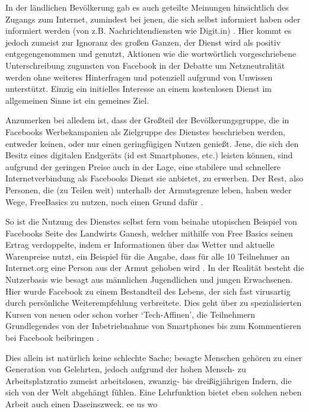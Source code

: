 \documentclass{article}
\begin{document}
In der ländlichen Bevölkerung gab es auch geteilte Meinungen hinsichtlich des Zugangs zum Internet, zumindest bei jenen, die sich selbst informiert haben oder informiert werden (von z.B. Nachrichtendiensten wie Digit.in) \parencite{digitYT}.
Hier kommt es jedoch zumeist zur Ignoranz des großen Ganzen, der Dienst wird als positiv entgegengenommen und genutzt, Aktionen wie die wortwörtlich vorgeschriebene Unterschreibung zugunsten von Facebook in der Debatte um Netzneutralität\autocite{ndtvYT} werden ohne weiteres Hinterfragen und potenziell aufgrund von Unwissen unterstützt.
Einzig ein initielles Interesse an einem kostenlosen Dienst im allgemeinen Sinne ist ein gemeines Ziel.

\medskip

Anzumerken bei alledem ist, dass der Großteil der Bevölkerungsgruppe, die in Facebooks Werbekampanien als Zielgruppe des Dienstes beschrieben werden, entweder keinen, oder nur einen geringfügigen Nutzen genießt.
Jene, die sich den Besitz eines digitalen Endgeräts (id est Smartphones, etc.) leisten können, sind aufgrund der geringen Preise auch in der Lage, eine stabilere und schnellere Internetverbindung als Facebooks Dienst sie anbietet, zu erwerben.
Der Rest, also Personen, die (zu Teilen weit) unterhalb der Armutsgrenze leben, haben weder Wege, FreeBasics zu nutzen, noch einen Grund dafür \parencite[257]{everydayLife}.

\medskip

So ist die Nutzung des Dienstes selbst fern vom beinahe utopischen Beispiel von Facebooks Seite des Landwirts Ganesh, welcher mithilfe von Free Basics seinen Ertrag verdoppelte, indem er Informationen über das Wetter und aktuelle Warenpreise nutzt, ein Beispiel für die Angabe, dass für alle 10 Teilnehmer an Internet.org eine Person aus der Armut gehoben wird \parencite[4]{prasad2017}.
In der Realität besteht die Nutzerbasis wie besagt aus männlichen Jugendlichen und jungen Erwachsenen.
Hier wurde Facebook zu einem Bestandteil des Lebens, der sich fast virusartig durch persönliche Weiterempfehlung verbreitete.
Dies geht über zu spezialisierten Kursen von neuen oder schon vorher `Tech-Affinen', die Teilnehmern Grundlegendes von der Inbetriebnahme von Smartphones bis zum Kommentieren bei Facebook beibringen \parencite{empowermentThroughFacebook}.

\medskip

Dies allein ist natürlich keine schlechte Sache; besagte Menschen gehören zu einer Generation von Gelehrten, jedoch aufgrund der hohen Mensch- zu Arbeitsplatzratio zumeist arbeitslosen, zwanzig- bis dreißigjährigen Indern, die sich von der Welt abgehängt fühlen.
Eine Lehrfunktion bietet eben solchen neben Arbeit auch einen Daseinszweck.
ee us wo
\medskip
\end{document}
